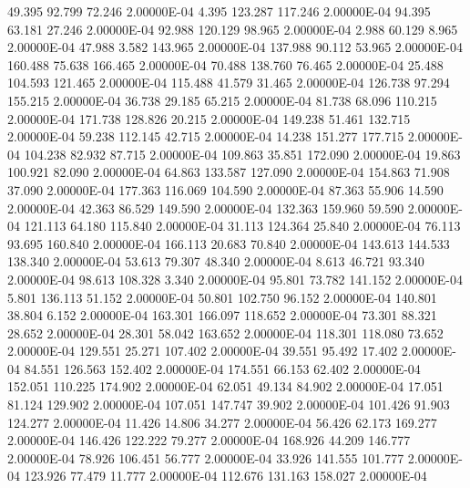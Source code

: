     49.395    92.799    72.246  2.00000E-04
     4.395   123.287   117.246  2.00000E-04
    94.395    63.181    27.246  2.00000E-04
    92.988   120.129    98.965  2.00000E-04
     2.988    60.129     8.965  2.00000E-04
    47.988     3.582   143.965  2.00000E-04
   137.988    90.112    53.965  2.00000E-04
   160.488    75.638   166.465  2.00000E-04
    70.488   138.760    76.465  2.00000E-04
    25.488   104.593   121.465  2.00000E-04
   115.488    41.579    31.465  2.00000E-04
   126.738    97.294   155.215  2.00000E-04
    36.738    29.185    65.215  2.00000E-04
    81.738    68.096   110.215  2.00000E-04
   171.738   128.826    20.215  2.00000E-04
   149.238    51.461   132.715  2.00000E-04
    59.238   112.145    42.715  2.00000E-04
    14.238   151.277   177.715  2.00000E-04
   104.238    82.932    87.715  2.00000E-04
   109.863    35.851   172.090  2.00000E-04
    19.863   100.921    82.090  2.00000E-04
    64.863   133.587   127.090  2.00000E-04
   154.863    71.908    37.090  2.00000E-04
   177.363   116.069   104.590  2.00000E-04
    87.363    55.906    14.590  2.00000E-04
    42.363    86.529   149.590  2.00000E-04
   132.363   159.960    59.590  2.00000E-04
   121.113    64.180   115.840  2.00000E-04
    31.113   124.364    25.840  2.00000E-04
    76.113    93.695   160.840  2.00000E-04
   166.113    20.683    70.840  2.00000E-04
   143.613   144.533   138.340  2.00000E-04
    53.613    79.307    48.340  2.00000E-04
     8.613    46.721    93.340  2.00000E-04
    98.613   108.328     3.340  2.00000E-04
    95.801    73.782   141.152  2.00000E-04
     5.801   136.113    51.152  2.00000E-04
    50.801   102.750    96.152  2.00000E-04
   140.801    38.804     6.152  2.00000E-04
   163.301   166.097   118.652  2.00000E-04
    73.301    88.321    28.652  2.00000E-04
    28.301    58.042   163.652  2.00000E-04
   118.301   118.080    73.652  2.00000E-04
   129.551    25.271   107.402  2.00000E-04
    39.551    95.492    17.402  2.00000E-04
    84.551   126.563   152.402  2.00000E-04
   174.551    66.153    62.402  2.00000E-04
   152.051   110.225   174.902  2.00000E-04
    62.051    49.134    84.902  2.00000E-04
    17.051    81.124   129.902  2.00000E-04
   107.051   147.747    39.902  2.00000E-04
   101.426    91.903   124.277  2.00000E-04
    11.426    14.806    34.277  2.00000E-04
    56.426    62.173   169.277  2.00000E-04
   146.426   122.222    79.277  2.00000E-04
   168.926    44.209   146.777  2.00000E-04
    78.926   106.451    56.777  2.00000E-04
    33.926   141.555   101.777  2.00000E-04
   123.926    77.479    11.777  2.00000E-04
   112.676   131.163   158.027  2.00000E-04
